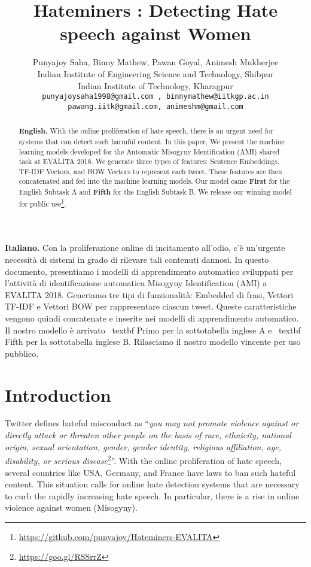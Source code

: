 \documentclass[11pt]{article}
\title{Hateminers : Detecting Hate speech against Women}
\author{Punyajoy Saha\textsuperscript{}, Binny Mathew\textsuperscript{},  Pawan Goyal\textsuperscript{}, Animesh Mukherjee\textsuperscript{}\\
	\textsuperscript{} Indian Institute of Engineering Science and Technology, Shibpur\\	
	\textsuperscript{} Indian Institute of Technology, Kharagpur\\
	{\tt \small punyajoysaha1998@gmail.com  , binnymathew@iitkgp.ac.in} \\
	{\tt \small pawang.iitk@gmail.com, animeshm@gmail.com}}
\date{}
\begin{document}
\maketitle
\begin{abstract}
  \textbf{English.} With the online proliferation of hate speech, there is an urgent need for systems that can detect such harmful content. In this paper, We present the machine learning models developed for the Automatic Misogyny Identification (AMI) shared task at EVALITA 2018. We generate three types of features: Sentence Embeddings, TF-IDF Vectors, and BOW Vectors to represent each tweet. These features are then concatenated and fed into the machine learning models. Our model came \textbf{First} for the English Subtask A and \textbf{Fifth} for the English Subtask B. We release our winning model for public use\footnote{\label{model_link}\url{https://github.com/punyajoy/Hateminers-EVALITA}}.
\end{abstract}

\begin{abstract-alt}
 \textrm{\bf{Italiano.}} Con la proliferazione online di incitamento all'odio, c'è un'urgente necessità di sistemi in grado di rilevare tali contenuti dannosi. In questo documento, presentiamo i modelli di apprendimento automatico sviluppati per l'attività di identificazione automatica Misogyny Identification (AMI) a EVALITA 2018. Generiamo tre tipi di funzionalità: Embedded di frasi, Vettori TF-IDF e Vettori BOW per rappresentare ciascun tweet. Queste caratteristiche vengono quindi concatenate e inserite nei modelli di apprendimento automatico. Il nostro modello è arrivato \ textbf {Primo} per la sottotabella inglese A e \ textbf {Fifth} per la sottotabella inglese B. Rilasciamo il nostro modello vincente per uso pubblico.
\end{abstract-alt}


\section{Introduction}
 Twitter defines hateful misconduct as ``\textit{you may not promote violence against or directly attack or threaten other people on the basis of race, ethnicity, national origin, sexual orientation, gender, gender identity, religious affiliation, age, disability, or serious disease}\footnote{\url{https://goo.gl/RSSrrZ}}''. With the online proliferation of hate speech, several countries like USA, Germany, and France have laws to ban such hateful content. This situation calls for online hate detection systems that are necessary to curb the rapidly increasing hate speech. In particular, there is a rise in online violence against women (Misogyny).
\end{document}
